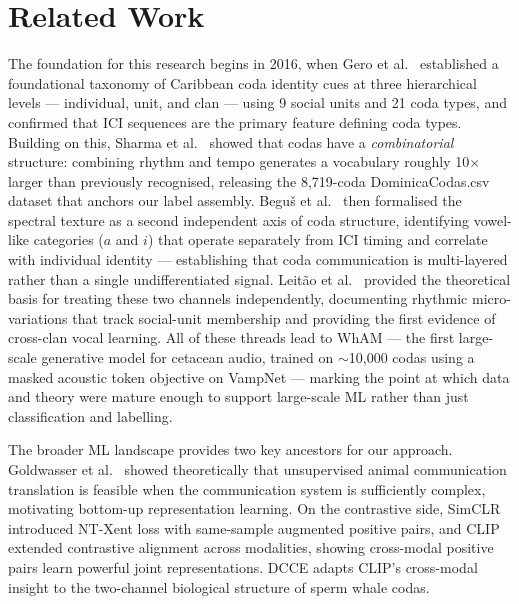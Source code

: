 \documentclass[9pt,a4paper,twocolumn,twoside]{rho-class/rho}
\begin{document}
\section{Related Work}
\label{sec:related}

The foundation for this research begins in 2016, when Gero et al.\ \cite{gero2016identity} established a foundational taxonomy of Caribbean coda identity cues at three hierarchical levels --- individual, unit, and clan --- using 9 social units and 21 coda types, and confirmed that ICI sequences are the primary feature defining coda types. Building on this, Sharma et al.\ \cite{sharma2024combinatorial} showed that codas have a \emph{combinatorial} structure: combining rhythm and tempo generates a vocabulary roughly 10$\times$ larger than previously recognised, releasing the 8,719-coda DominicaCodas.csv dataset that anchors our label assembly. Beguš et al.\ \cite{begus2024vowels} then formalised the spectral texture as a second independent axis of coda structure, identifying vowel-like categories ($a$ and $i$) that operate separately from ICI timing and correlate with individual identity --- establishing that coda communication is multi-layered rather than a single undifferentiated signal. Leitão et al.\ \cite{leitao2025social} provided the theoretical basis for treating these two channels independently, documenting rhythmic micro-variations that track social-unit membership and providing the first evidence of cross-clan vocal learning. All of these threads lead to WhAM \cite{paradise2025wham} --- the first large-scale generative model for cetacean audio, trained on $\sim$10,000 codas using a masked acoustic token objective on VampNet \cite{garcia2023vampnet} --- marking the point at which data and theory were mature enough to support large-scale ML rather than just classification and labelling.

The broader ML landscape provides two key ancestors for our approach. Goldwasser et al.\ \cite{goldwasser2023umt} showed theoretically that unsupervised animal communication translation is feasible when the communication system is sufficiently complex, motivating bottom-up representation learning. On the contrastive side, SimCLR \cite{chen2020simclr} introduced NT-Xent loss with same-sample augmented positive pairs, and CLIP \cite{radford2021clip} extended contrastive alignment across modalities, showing cross-modal positive pairs learn powerful joint representations. DCCE adapts CLIP's cross-modal insight to the two-channel biological structure of sperm whale codas.
\end{document}
